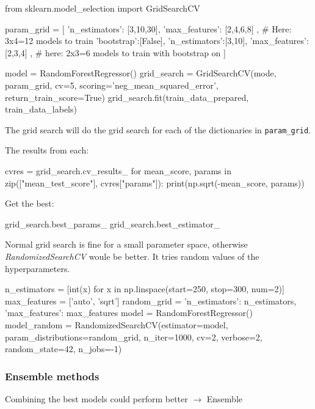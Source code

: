 \documentclass{article}
\begin{document}
    \begin{python}
        from sklearn.model_selection import GridSearchCV

        param_grid = [
            {'n_estimators': [3,10,30],
             'max_features': [2,4,6,8]
            },      # Here: 3x4=12 models to train
            {'bootstrap':[False],
             'n_estimators':[3,10],
             'max_features':[2,3,4]
            },      # here: 2x3=6 models to train with bootstrap on
        ]

        model = RandomForestRegressor()
        grid_search = GridSearchCV(mode, param_grid, cv=5,
                        scoring='neg_mean_squared_error',
                        return_train_score=True)
        grid_search.fit(train_data_prepared, train_data_labels)
    \end{python}
    The grid search will do the grid search for each of the dictionaries in \verb;param_grid;.

    The results from each:
    \begin{python}
        cvres = grid_search.cv_results_
        for mean_score, params in zip(["mean_test_score"], cvres["params"]):
            print(np.sqrt(-mean_score, params))
    \end{python}

    Get the best:
    \begin{python}
        grid_search.best_params_
        grid_search.best_estimator_
    \end{python}

    Normal grid search is fine for a small parameter space, otherwise \emph{RandomizedSearchCV} woule be better.
    It tries random values of the hyperparameters.
    \begin{python}
        n_estimators = [int(x) for x in np.linspace(start=250, stop=300, num=2)]
        max_features = ['auto', 'sqrt']
        random_grid = {'n_estimators': n_estimators,
                       'max_features': max_features}
        model = RandomForestRegressor()
        model_random = RandomizedSearchCV(estimator=model,
                                    param_distributions=random_grid,
                                    n_iter=1000, cv=2, verbose=2,
                                    random_state=42, n_jobs=-1)
    \end{python}

    \subsubsection*{Ensemble methods}
    Combining the best models could perform better $\rightarrow$ Ensemble
\end{document}

